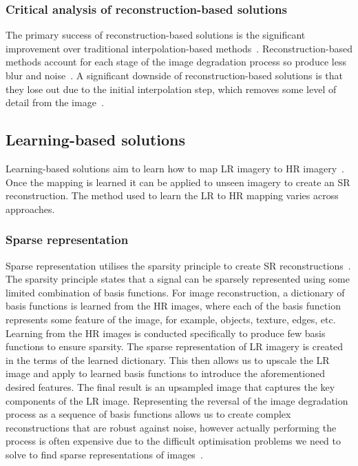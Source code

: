 \subsubsection{Critical analysis of reconstruction-based solutions}
The primary success of reconstruction-based solutions is the significant improvement over traditional interpolation-based methods~\cite{interpolation}. Reconstruction-based methods account for each stage of the image degradation process so produce less blur and noise~\cite{interpolation}. A significant downside of reconstruction-based solutions is that they lose out due to the initial interpolation step, which removes some level of detail from the image~\cite{remoteSensingGANsReview}.

\subsection{Learning-based solutions}
Learning-based solutions aim to learn how to map LR imagery to HR imagery~\cite{superResRemoteSensingOverview}. Once the mapping is learned it can be applied to unseen imagery to create an SR reconstruction. The method used to learn the LR to HR mapping varies across approaches.

\subsubsection{Sparse representation}
Sparse representation utilises the sparsity principle to create SR reconstructions~\cite{superResRemoteSensingOverview}. The sparsity principle states that a signal can be sparsely represented using some limited combination of basis functions. For image reconstruction, a dictionary of basis functions is learned from the HR images, where each of the basis function represents some feature of the image, for example, objects, texture, edges, etc. Learning from the HR images is conducted specifically to produce few basis functions to ensure sparsity. The sparse representation of LR imagery is created in the terms of the learned dictionary. This then allows us to upscale the LR image and apply to learned basis functions to introduce the aforementioned desired features. The final result is an upsampled image that captures the key components of the LR image. Representing the reversal of the image degradation process as a sequence of basis functions allows us to create complex reconstructions that are robust against noise, however actually performing the process is often expensive due to the difficult optimisation problems we need to solve to find sparse representations of images~\cite{sparseRep}.

